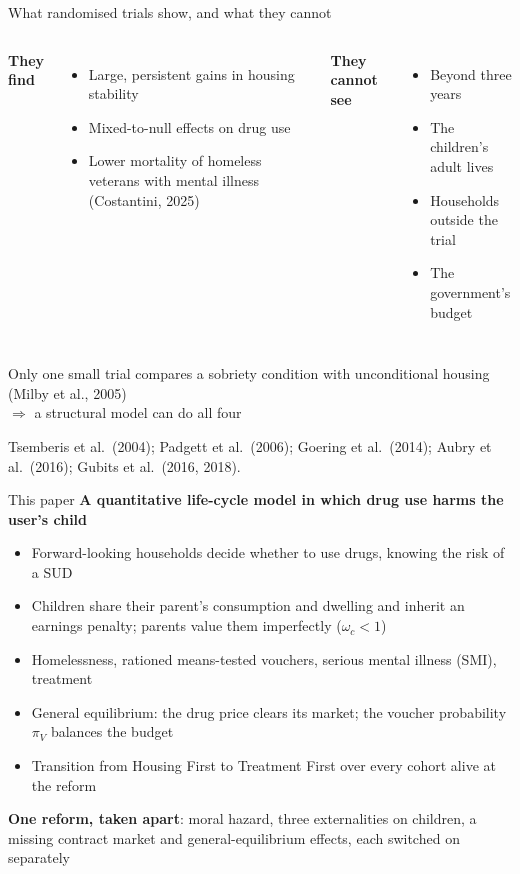 \documentclass[aspectratio=169,11pt]{beamer}
\newcommand{\HF}{Housing First}
\newcommand{\TF}{Treatment First}
\newcommand{\source}[1]{\par\vfill{\color{lgrey}\tiny #1}}
\begin{document}
\begin{frame}{What randomised trials show, and what they cannot}
\begin{columns}[T]
\textbf{They find}
\begin{itemize}
\item Large, persistent gains in housing stability
\item Mixed-to-null effects on drug use
\item Lower mortality of homeless veterans with mental illness (Costantini, 2025)
\end{itemize}
\textbf{They cannot see}
\begin{itemize}
\item Beyond three years
\item The children's adult lives
\item Households outside the trial
\item The government's budget
\end{itemize}
\end{columns}
\vspace{0.5cm}
Only one small trial compares a sobriety condition with unconditional housing (Milby et al., 2005)\\[0.2em]
$\Rightarrow$ a structural model can do all four
\source{Tsemberis et al.\ (2004); Padgett et al.\ (2006); Goering et al.\ (2014); Aubry et al.\ (2016); Gubits et al.\ (2016, 2018).}
\end{frame}

\begin{frame}{This paper}
\textbf{A quantitative life-cycle model in which drug use harms the user's child}
\begin{itemize}\setlength\itemsep{0.25em}
\item Forward-looking households decide whether to use drugs, knowing the risk of a SUD
\item Children share their parent's consumption and dwelling and inherit an earnings penalty; parents value them imperfectly ($\omega_c<1$)
\item Homelessness, rationed means-tested vouchers, serious mental illness (SMI), treatment
\item General equilibrium: the drug price clears its market; the voucher probability $\pi_V$ balances the budget
\item Transition from \HF{} to \TF{} over every cohort alive at the reform
\end{itemize}
\vspace{0.3cm}
\textbf{One reform, taken apart}: moral hazard, three externalities on children, a missing contract market and general-equilibrium effects, each switched on separately
\end{frame}
\end{document}
